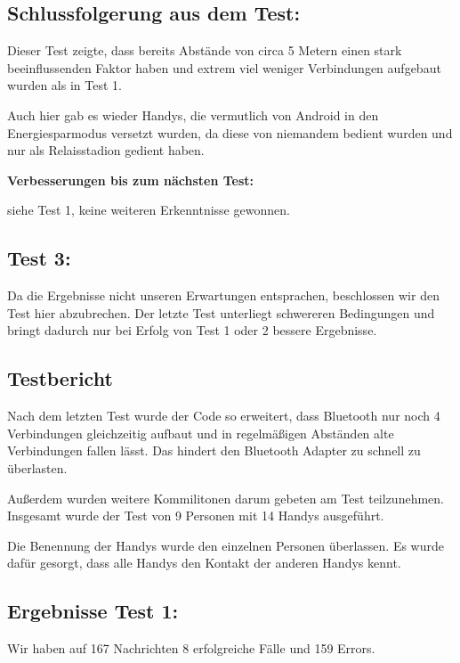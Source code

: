 \clearpage\subsection{Schlussfolgerung aus dem
Test:}\label{schlussfolgerung-aus-dem-test-1}

Dieser Test zeigte, dass bereits Abstände von circa 5 Metern einen stark
beeinflussenden Faktor haben und extrem viel weniger Verbindungen
aufgebaut wurden als in Test 1.

Auch hier gab es wieder Handys, die vermutlich von Android in den
Energiesparmodus versetzt wurden, da diese von niemandem bedient wurden
und nur als Relaisstadion gedient haben.

\textbf{Verbesserungen bis zum nächsten Test:}

siehe Test 1, keine weiteren Erkenntnisse gewonnen.

\clearpage\subsection{Test 3:}\label{test-3}

Da die Ergebnisse nicht unseren Erwartungen entsprachen, beschlossen wir
den Test hier abzubrechen. Der letzte Test unterliegt schwereren
Bedingungen und bringt dadurch nur bei Erfolg von Test 1 oder 2 bessere
Ergebnisse.

\clearpage\subsection{Testbericht}\label{testbericht-1}

Nach dem letzten Test wurde der Code so erweitert, dass Bluetooth nur
noch 4 Verbindungen gleichzeitig aufbaut und in regelmäßigen Abständen
alte Verbindungen fallen lässt. Das hindert den Bluetooth Adapter zu
schnell zu überlasten.

Außerdem wurden weitere Kommilitonen darum gebeten am Test teilzunehmen.
Insgesamt wurde der Test von 9 Personen mit 14 Handys ausgeführt.

Die Benennung der Handys wurde den einzelnen Personen überlassen. Es
wurde dafür gesorgt, dass alle Handys den Kontakt der anderen Handys
kennt.

\clearpage\subsection{Ergebnisse Test 1:}\label{ergebnisse-test-1-1}

Wir haben auf 167 Nachrichten 8 erfolgreiche Fälle und 159 Errors.


